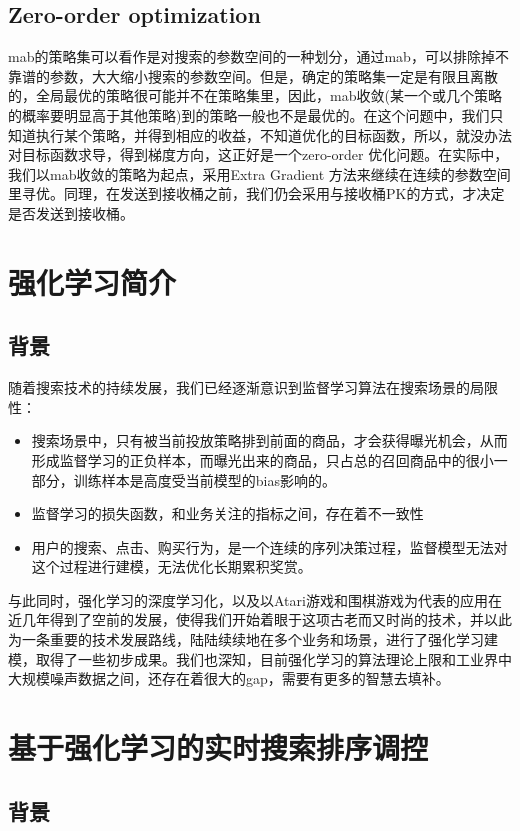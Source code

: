 \subsection{Zero-order optimization}
mab的策略集可以看作是对搜索的参数空间的一种划分，通过mab，可以排除掉不靠谱的参数，大大缩小搜索的参数空间。但是，确定的策略集一定是有限且离散的，全局最优的策略很可能并不在策略集里，因此，mab收敛(某一个或几个策略的概率要明显高于其他策略)到的策略一般也不是最优的。在这个问题中，我们只知道执行某个策略，并得到相应的收益，不知道优化的目标函数，所以，就没办法对目标函数求导，得到梯度方向，这正好是一个zero-order 优化问题。在实际中，我们以mab收敛的策略为起点，采用Extra Gradient 方法来继续在连续的参数空间里寻优。同理，在发送到接收桶之前，我们仍会采用与接收桶PK的方式，才决定是否发送到接收桶。

\section{强化学习简介}

\subsection{背景}
随着搜索技术的持续发展，我们已经逐渐意识到监督学习算法在搜索场景的局限性：
\begin{itemize}  
\item 搜索场景中，只有被当前投放策略排到前面的商品，才会获得曝光机会，从而形成监督学习的正负样本，而曝光出来的商品，只占总的召回商品中的很小一部分，训练样本是高度受当前模型的bias影响的。
\item 监督学习的损失函数，和业务关注的指标之间，存在着不一致性
\item 用户的搜索、点击、购买行为，是一个连续的序列决策过程，监督模型无法对这个过程进行建模，无法优化长期累积奖赏。
\end{itemize}
与此同时，强化学习的深度学习化，以及以Atari游戏和围棋游戏为代表的应用在近几年得到了空前的发展，使得我们开始着眼于这项古老而又时尚的技术，并以此为一条重要的技术发展路线，陆陆续续地在多个业务和场景，进行了强化学习建模，取得了一些初步成果。我们也深知，目前强化学习的算法理论上限和工业界中大规模噪声数据之间，还存在着很大的gap，需要有更多的智慧去填补。

\section{基于强化学习的实时搜索排序调控}
\subsection{背景}

